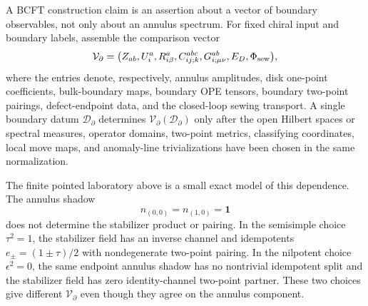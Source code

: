 \begin{construction}
\label{constr:bcft-boundary-observable-vector}
A BCFT construction claim is an assertion about a vector of boundary
observables, not only about an annulus spectrum.  For fixed chiral input and
boundary labels, assemble the comparison vector
\[
  \mathcal V_{\partial}
  =
  \bigl(
    Z_{ab},
    U^a_i,
    R^a_{i\beta},
    C^{abc}_{ij;k},
    G^{ab}_{i;\mu\nu},
    E_D,
    \Phi_{\rm sew}
  \bigr),
\]
where the entries denote, respectively, annulus amplitudes, disk one-point
coefficients, bulk-boundary maps, boundary OPE tensors, boundary two-point
pairings, defect-endpoint data, and the closed-loop sewing transport.  A
single boundary datum \(\mathcal D_\partial\) determines
\(\mathcal V_{\partial}(\mathcal D_\partial)\) only after the open Hilbert
spaces or spectral measures, operator domains, two-point metrics, classifying
coordinates, local move maps, and anomaly-line trivializations have been
chosen in the same normalization.

The finite pointed laboratory above is a small exact model of this dependence.
The annulus shadow
\[
  n_{(0,0)}=n_{(1,0)}=\mathbf 1
\]
does not determine the stabilizer product or pairing.  In the semisimple
choice \(\tau^2=1\), the stabilizer field has an inverse channel and
idempotents \(e_\pm=(1\pm\tau)/2\) with nondegenerate two-point pairing.  In
the nilpotent choice \(\epsilon^2=0\), the same endpoint annulus shadow has no
nontrivial idempotent split and the stabilizer field has zero identity-channel
two-point partner.  These two choices give different
\(\mathcal V_{\partial}\) even though they agree on the annulus component.


\end{construction}
